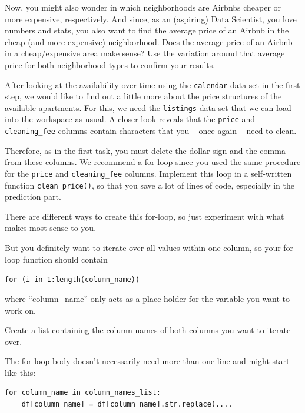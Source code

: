 \documentclass[
  11pt,
]{article}
\newenvironment{tips}[1]
  {
  \begin{itemize}
  \footnotesize
  \renewcommand{\labelitemi}{
    \raisebox{-.7\height}[0pt][0pt]{
      {\setkeys{Gin}{width=3em,keepaspectratio}
        \texttt{[image: images/\#1.png]}}
    }
  }
  \setlength{\fboxsep}{1em}
  \begin{rbox}
  \item
  }
  {
  \end{rbox}
  \end{itemize}
  }
\newenvironment{tipsp}[1]
  {
  \begin{itemize}
  \footnotesize
  \renewcommand{\labelitemi}{
    \raisebox{-.7\height}[0pt][0pt]{
      {\setkeys{Gin}{width=3em,keepaspectratio}
        \texttt{[image: images/\#1.png]}}
    }
  }
  \setlength{\fboxsep}{1em}
  \begin{pbox}
  \item
  }
  {
  \end{pbox}
  \end{itemize}
  }
\begin{document}
Now, you might also wonder in which neighborhoods are Airbnbs cheaper or more expensive, respectively. And since, as an (aspiring) Data Scientist, you love numbers and stats, you also want to find the average price of an Airbnb in the cheap (and more expensive) neighborhood. Does the average price of an Airbnb in a cheap/expensive area make sense? Use the variation around that average price for both neighborhood types to confirm your results.

After looking at the availability over time using the \texttt{calendar} data set in the first step, we would like to find out a little more about the price structures of the available apartments. For this, we need the \texttt{listings} data set that we can load into the workspace as usual. A closer look reveals that the \texttt{price} and \texttt{cleaning\_fee} columns contain characters that you -- once again -- need to clean.

Therefore, as in the first task, you must delete the dollar sign and the comma from these columns. We recommend a for-loop since you used the same procedure for the \texttt{price} and \texttt{cleaning\_fee} columns. Implement this loop in a self-written function \texttt{clean\_price()}, so that you save a lot of lines of code, especially in the prediction part.

\begin{tips}r
There are different ways to create this for-loop, so just experiment with what makes most sense to you.

But you definitely want to iterate over all values within one column, so your for-loop function should contain

\texttt{for\ (i\ in\ 1:length(column\_name))}

where ``column\_name'' only acts as a place holder for the variable you want to work on.

\end{tips}

\begin{tipsp}p

Create a list containing the column names of both columns you want to iterate over.

The for-loop body doesn't necessarily need more than one line and might start like this:

\begin{verbatim}
for column_name in column_names_list:
    df[column_name] = df[column_name].str.replace(....
\end{verbatim}

\end{tipsp}
\end{document}

